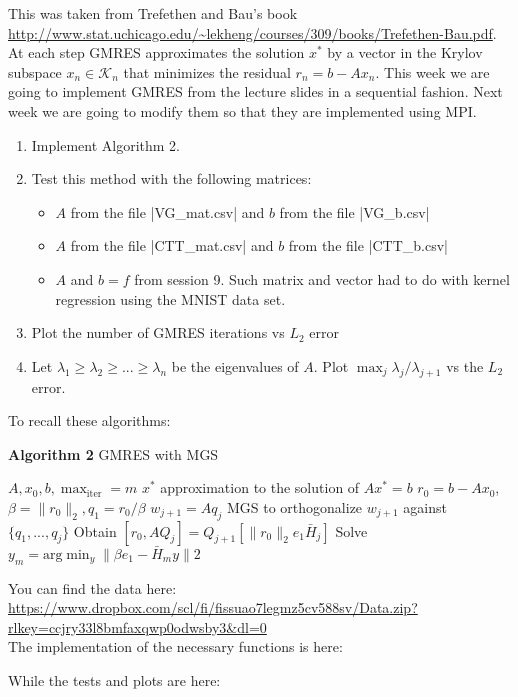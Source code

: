 \documentclass[11pt]{article}
\begin{document}
This was taken from Trefethen and Bau's book \url{http://www.stat.uchicago.edu/~lekheng/courses/309/books/Trefethen-Bau.pdf}.\\


At each step GMRES approximates the solution $x^*$ by a vector in the Krylov subspace $x_n \in \mathcal{K}_n$ that minimizes the residual $r_n = b - Ax_n$. This week we are going to implement GMRES from the lecture slides in a sequential fashion. Next week we are going to modify them so that they are implemented using MPI. 

\begin{enumerate}
   \item Implement Algorithm 2.
   \item Test this method with the following matrices:
   \begin{itemize}
       \item $A$ from the file |VG_mat.csv| and $b$ from the file |VG_b.csv|
       \item $A$ from the file |CTT_mat.csv| and $b$ from the file |CTT_b.csv|
       \item $A$ and $b = f$ from session 9. Such matrix and vector had to do with kernel regression using the MNIST data set.
   \end{itemize}
   \item Plot the number of GMRES iterations vs $L_2$ error
   \item Let $\lambda_1 \geq \lambda_2 \geq ... \geq \lambda_n$ be the eigenvalues of $A$. Plot $\max_{j}\lambda_j/\lambda_{j+1}$ vs the $L_2$ error.
\end{enumerate}


To recall these algorithms:

\scriptsize
\begin{algorithm}
\caption{\textbf{Algorithm 2} GMRES with MGS}\label{GMRES - MGS}
\begin{algorithmic}
\Input $A, x_0, b, \max_{\text{iter}} = m$
\Output $x^*$ approximation to the solution of $Ax^* = b$
\State $r_0 = b - Ax_0$, $\beta = \|r_0\|_2, q_1 = r_0/\beta$
    \State $w_{j+1} = Aq_j$
    \State MGS to orthogonalize $w_{j+1}$ against $\{q_1, ..., q_j\}$
    \State Obtain $[r_0, AQ_j] = Q_{j+1}[\|r_0\|_2 e_1 \bar{H}_j]$
\EndFor
\State Solve $y_m = \text{arg}\min_{y} \| \beta e_1 - \bar{H}_m y \|2$
\end{algorithmic}
\end{algorithm}
\normalsize

You can find the data here: \url{https://www.dropbox.com/scl/fi/fissuao7legmz5cv588sv/Data.zip?rlkey=ccjry33l8bmfaxqwp0odwsby3&dl=0} \\

The implementation of the necessary functions is here:



While the tests and plots are here:


\end{document}
